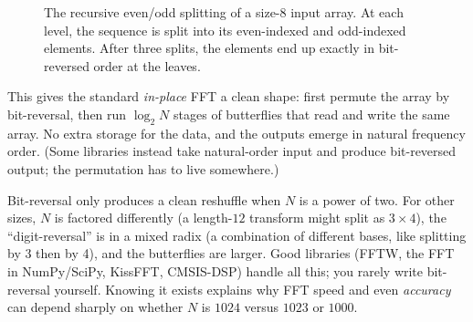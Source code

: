 \begin{figure}[H]
\centering
{}
\caption{The recursive even/odd splitting of a size-$8$ input array. At each level, the sequence is split into its even-indexed and odd-indexed elements. After three splits, the elements end up exactly in bit-reversed order at the leaves.}
\label{ch09:fig-split-tree}
\end{figure}


This gives the standard \emph{in-place} FFT a clean shape: first permute the array by
bit-reversal, then run $\log_2 N$ stages of butterflies that read and write the same
array. No extra storage for the data, and the outputs emerge in natural frequency order.
(Some libraries instead take natural-order input and produce bit-reversed output; the
permutation has to live somewhere.)

\begin{trapbox}
Bit-reversal only produces a clean reshuffle when $N$ is a power of two. For other sizes,
$N$ is factored differently (a length-$12$ transform might split as $3\times 4$), the
``digit-reversal'' is in a mixed radix (a combination of different bases, like splitting by 3 then by 4), and the butterflies are larger. Good libraries
(FFTW, the FFT in NumPy/SciPy, KissFFT, CMSIS-DSP) handle all this; you rarely
write bit-reversal yourself. Knowing it exists explains why FFT speed and even
\emph{accuracy} can depend sharply on whether $N$ is $1024$ versus $1023$ or $1000$.
\end{trapbox}

